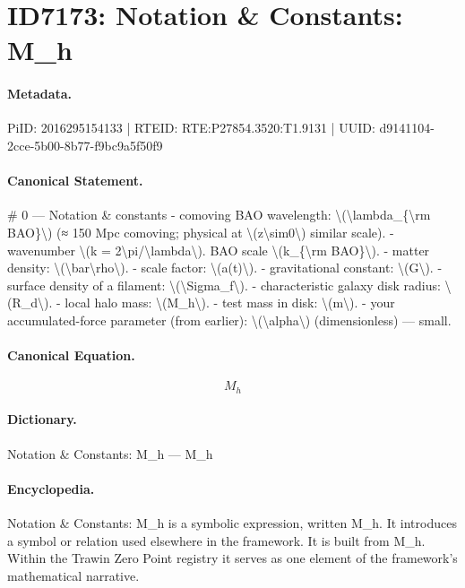 \section*{ID7173: Notation \& Constants: M\_h}
\paragraph{Metadata.}
PiID: 2016295154133 | RTEID: RTE:P27854.3520:T1.9131 | UUID: d9141104-2cce-5b00-8b77-f9bc9a5f50f9

\paragraph{Canonical Statement.}
\# 0 — Notation \& constants - comoving BAO wavelength: \textbackslash{}(\textbackslash{}lambda\_\{\textbackslash{}rm BAO\}\textbackslash{}) (≈ 150 Mpc comoving; physical at \textbackslash{}(z\textbackslash{}sim0\textbackslash{}) similar scale). - wavenumber \textbackslash{}(k = 2\textbackslash{}pi/\textbackslash{}lambda\textbackslash{}). BAO scale \textbackslash{}(k\_\{\textbackslash{}rm BAO\}\textbackslash{}). - matter density: \textbackslash{}(\textbackslash{}bar\textbackslash{}rho\textbackslash{}). - scale factor: \textbackslash{}(a(t)\textbackslash{}). - gravitational constant: \textbackslash{}(G\textbackslash{}). - surface density of a filament: \textbackslash{}(\textbackslash{}Sigma\_f\textbackslash{}). - characteristic galaxy disk radius: \textbackslash{}(R\_d\textbackslash{}). - local halo mass: \textbackslash{}(M\_h\textbackslash{}). - test mass in disk: \textbackslash{}(m\textbackslash{}). - your accumulated-force parameter (from earlier): \textbackslash{}(\textbackslash{}alpha\textbackslash{}) (dimensionless) — small.

\paragraph{Canonical Equation.}
\[
M_h
\]

\paragraph{Dictionary.}
Notation \& Constants: M\_h — M\_h

\paragraph{Encyclopedia.}
Notation \& Constants: M\_h is a symbolic expression, written M\_h. It introduces a symbol or relation used elsewhere in the framework. It is built from M\_h. Within the Trawin Zero Point registry it serves as one element of the framework's mathematical narrative.
